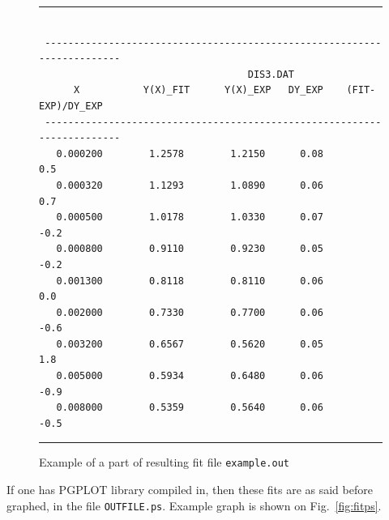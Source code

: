 \documentclass[12pt]{article}
\begin{document}
\begin{figure}
\begin{center}
\hrule
\small
\begin{verbatim}

 ------------------------------------------------------------------------
                                    DIS3.DAT                         
      X           Y(X)_FIT      Y(X)_EXP   DY_EXP    (FIT-EXP)/DY_EXP 
 ------------------------------------------------------------------------ 
   0.000200        1.2578        1.2150      0.08         0.5
   0.000320        1.1293        1.0890      0.06         0.7
   0.000500        1.0178        1.0330      0.07        -0.2
   0.000800        0.9110        0.9230      0.05        -0.2
   0.001300        0.8118        0.8110      0.06         0.0
   0.002000        0.7330        0.7700      0.06        -0.6
   0.003200        0.6567        0.5620      0.05         1.8
   0.005000        0.5934        0.6480      0.06        -0.9
   0.008000        0.5359        0.5640      0.06        -0.5 

\end{verbatim}
\hrule
\end{center}
\caption{Example of a part of resulting fit file \texttt{example.out}}
\label{fig:fitout}
\end{figure}

If one has PGPLOT library compiled in, then these fits are as
said before graphed,
in the file \texttt{OUTFILE.ps}. Example graph is shown on Fig.~\ref{fig:fitps}.
\end{document}
